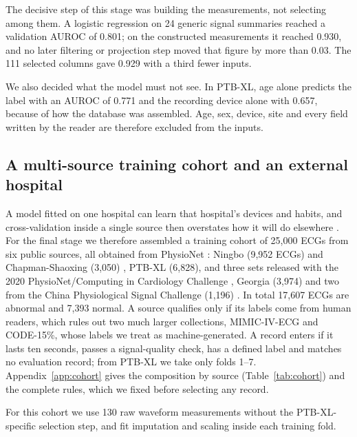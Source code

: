 \documentclass[letterpaper,11pt]{article}
\begin{document}
The decisive step of this stage was building the measurements, not selecting among them. A logistic regression on 24 generic signal summaries reached a validation AUROC of 0.801; on the constructed measurements it reached 0.930, and no later filtering or projection step moved that figure by more than 0.03. The 111 selected columns gave 0.929 with a third fewer inputs.

We also decided what the model must not see. In PTB-XL, age alone predicts the label with an AUROC of 0.771 and the recording device alone with 0.657, because of how the database was assembled. Age, sex, device, site and every field written by the reader are therefore excluded from the inputs.

\subsection{A multi-source training cohort and an external hospital}
\label{sec:cohort}

A model fitted on one hospital can learn that hospital's devices and habits, and cross-validation inside a single source then overstates how it will do elsewhere \parencite{leinonen2024empirical}. For the final stage we therefore assembled a training cohort of 25,000 ECGs from six public sources, all obtained from PhysioNet \parencite{goldberger2000physiobank}: Ningbo (9,952 ECGs) and Chapman-Shaoxing (3,050) \parencite{zheng2022ningbo,zheng2020database}, PTB-XL (6,828), and three sets released with the 2020 PhysioNet/Computing in Cardiology Challenge \parencite{perezalday2020classification}, Georgia (3,974) and two from the China Physiological Signal Challenge (1,196) \parencite{liu2018open}. In total 17,607 ECGs are abnormal and 7,393 normal. A source qualifies only if its labels come from human readers, which rules out two much larger collections, MIMIC-IV-ECG and CODE-15\%, whose labels we treat as machine-generated. A record enters if it lasts ten seconds, passes a signal-quality check, has a defined label and matches no evaluation record; from PTB-XL we take only folds 1--7. Appendix~\ref{app:cohort} gives the composition by source (Table~\ref{tab:cohort}) and the complete rules, which we fixed before selecting any record.


For this cohort we use 130 raw waveform measurements without the PTB-XL-specific selection step, and fit imputation and scaling inside each training fold.
\end{document}
